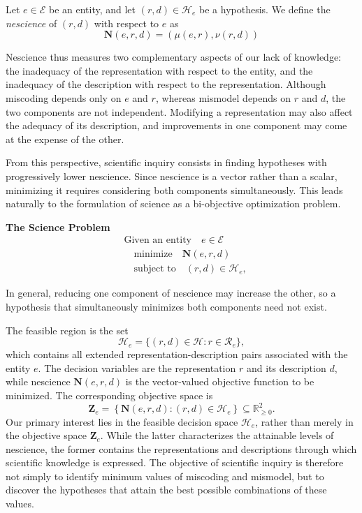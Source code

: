 \begin{definition}
Let $e\in\mathcal E$ be an entity, and let $(r,d)\in\mathcal H_e$ be a hypothesis. We define the \emph{nescience} of $(r,d)$ with respect to $e$ as
\[
\mathbf N(e,r,d) = \left(\mu(e,r),  \nu(r,d)\right)
\]
\end{definition}

Nescience thus measures two complementary aspects of our lack of knowledge: the inadequacy of the representation with respect to the entity, and the inadequacy of the description with respect to the representation. Although miscoding depends only on $e$ and $r$, whereas mismodel depends on $r$ and $d$, the two components are not independent. Modifying a representation may also affect the adequacy of its description, and improvements in one component may come at the expense of the other.

From this perspective, scientific inquiry consists in finding hypotheses with progressively lower nescience. Since nescience is a vector rather than a scalar, minimizing it requires considering both components simultaneously. This leads naturally to the formulation of science as a bi-objective optimization problem.

\begin{tBox}
\textbf{The Science Problem}
\begin{align*}
 & \text{Given an entity} \quad e\in\mathcal E\\
 & \quad \text{minimize} \quad \mathbf N(e,r,d)\\
 & \quad \text{subject to} \quad (r,d)\in\mathcal H_e,
\end{align*}
\end{tBox}

In general, reducing one component of nescience may increase the other, so a hypothesis that simultaneously minimizes both components need not exist.

The feasible region is the set
\[
\mathcal H_e = \{(r,d)\in\mathcal H:r\in\mathcal R_e\},
\]
which contains all extended representation-description pairs associated with the entity $e$. The decision variables are the representation $r$ and its description $d$, while nescience $\mathbf N(e,r,d)$ is the vector-valued objective function to be minimized. The corresponding objective space is
\[
\mathbf Z_e = \left\{\mathbf N(e,r,d):(r,d)\in\mathcal H_e \right\} \subseteq\mathbb R_{\geq0}^2.
\]
Our primary interest lies in the feasible decision space $\mathcal H_e$, rather than merely in the objective space $\mathbf Z_e$. While the latter characterizes the attainable levels of nescience, the former contains the representations and descriptions through which scientific knowledge is expressed. The objective of scientific inquiry is therefore not simply to identify minimum values of miscoding and mismodel, but to discover the hypotheses that attain the best possible combinations of these values.


